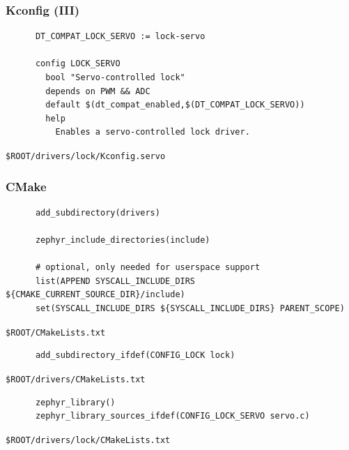 \documentclass[handout]{beamer}
\begin{document}
\begin{frame}[fragile]
  \frametitle{Kconfig (III)}
  \begin{listing}[H]
    \begin{verbatim}
      DT_COMPAT_LOCK_SERVO := lock-servo

      config LOCK_SERVO
        bool "Servo-controlled lock"
        depends on PWM && ADC
        default $(dt_compat_enabled,$(DT_COMPAT_LOCK_SERVO))
        help
          Enables a servo-controlled lock driver.

    \end{verbatim}
    \caption{\texttt{\$ROOT/drivers/lock/Kconfig.servo}}
  \end{listing}
\end{frame}

\begin{frame}[fragile]
  \frametitle{CMake}

  \begin{listing}[H]
    \begin{verbatim}
      add_subdirectory(drivers)

      zephyr_include_directories(include)

      # optional, only needed for userspace support
      list(APPEND SYSCALL_INCLUDE_DIRS ${CMAKE_CURRENT_SOURCE_DIR}/include)
      set(SYSCALL_INCLUDE_DIRS ${SYSCALL_INCLUDE_DIRS} PARENT_SCOPE)
    \end{verbatim}
    \caption{\texttt{\$ROOT/CMakeLists.txt}}
  \end{listing}

  \begin{listing}[H]
    \begin{verbatim}
      add_subdirectory_ifdef(CONFIG_LOCK lock)
    \end{verbatim}
    \caption{\texttt{\$ROOT/drivers/CMakeLists.txt}}
  \end{listing}

  \begin{listing}[H]
    \begin{verbatim}
      zephyr_library()
      zephyr_library_sources_ifdef(CONFIG_LOCK_SERVO servo.c)
    \end{verbatim}
    \caption{\texttt{\$ROOT/drivers/lock/CMakeLists.txt}}
  \end{listing}
\end{frame}
\end{document}
